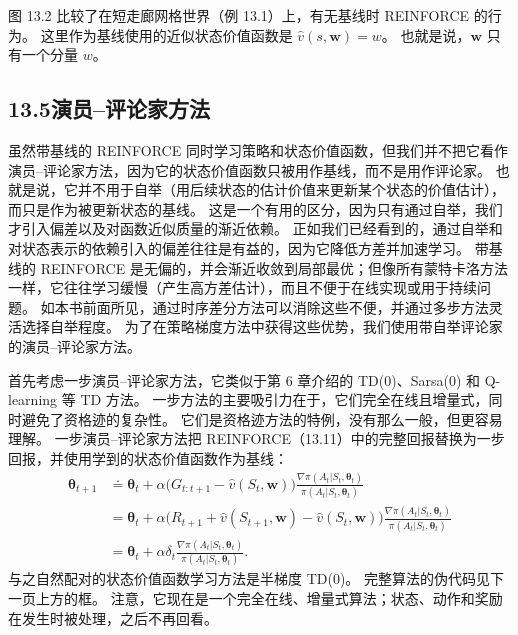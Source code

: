 \documentclass[UTF8, 12pt, fontset=fandol, oneside]{ctexart}
\begin{document}
图 13.2 比较了在短走廊网格世界（例 13.1）上，有无基线时 REINFORCE 的行为。
这里作为基线使用的近似状态价值函数是 $\hat v(s,\mathbf{w})=w$。
也就是说，$\mathbf{w}$ 只有一个分量 $w$。

\subsection*{13.5\quad 演员--评论家方法}

虽然带基线的 REINFORCE 同时学习策略和状态价值函数，但我们并不把它看作演员--评论家方法，因为它的状态价值函数只被用作基线，而不是用作评论家。
也就是说，它并不用于自举（用后续状态的估计价值来更新某个状态的价值估计），而只是作为被更新状态的基线。
这是一个有用的区分，因为只有通过自举，我们才引入偏差以及对函数近似质量的渐近依赖。
正如我们已经看到的，通过自举和对状态表示的依赖引入的偏差往往是有益的，因为它降低方差并加速学习。
带基线的 REINFORCE 是无偏的，并会渐近收敛到局部最优；但像所有蒙特卡洛方法一样，它往往学习缓慢（产生高方差估计），而且不便于在线实现或用于持续问题。
如本书前面所见，通过时序差分方法可以消除这些不便，并通过多步方法灵活选择自举程度。
为了在策略梯度方法中获得这些优势，我们使用带自举评论家的演员--评论家方法。

首先考虑一步演员--评论家方法，它类似于第 6 章介绍的 TD(0)、Sarsa(0) 和 Q-learning 等 TD 方法。
一步方法的主要吸引力在于，它们完全在线且增量式，同时避免了资格迹的复杂性。
它们是资格迹方法的特例，没有那么一般，但更容易理解。
一步演员--评论家方法把 REINFORCE（13.11）中的完整回报替换为一步回报，并使用学到的状态价值函数作为基线：
\begin{align}
\boldsymbol{\theta}_{t+1}
&\doteq \boldsymbol{\theta}_t+\alpha\bigl(G_{t:t+1}-\hat v(S_t,\mathbf{w})\bigr)
\frac{\nabla\pi(A_t|S_t,\boldsymbol{\theta}_t)}{\pi(A_t|S_t,\boldsymbol{\theta}_t)}
\tag{13.12}\\
&=\boldsymbol{\theta}_t+\alpha\bigl(R_{t+1}+\hat v(S_{t+1},\mathbf{w})-\hat v(S_t,\mathbf{w})\bigr)
\frac{\nabla\pi(A_t|S_t,\boldsymbol{\theta}_t)}{\pi(A_t|S_t,\boldsymbol{\theta}_t)}
\tag{13.13}\\
&=\boldsymbol{\theta}_t+\alpha\delta_t
\frac{\nabla\pi(A_t|S_t,\boldsymbol{\theta}_t)}{\pi(A_t|S_t,\boldsymbol{\theta}_t)}.
\tag{13.14}
\end{align}
与之自然配对的状态价值函数学习方法是半梯度 TD(0)。
完整算法的伪代码见下一页上方的框。
注意，它现在是一个完全在线、增量式算法；状态、动作和奖励在发生时被处理，之后不再回看。
\end{document}
